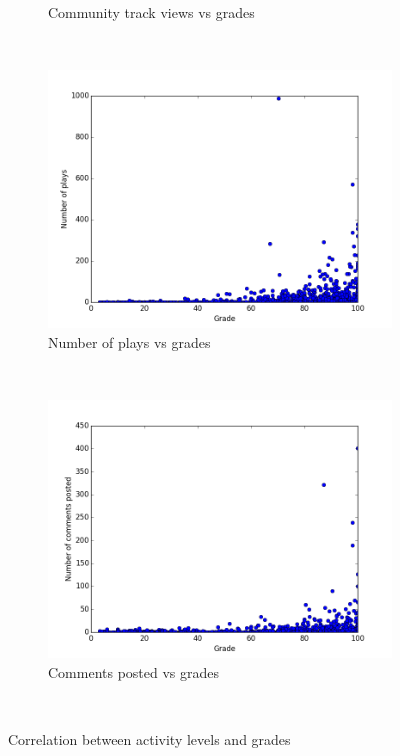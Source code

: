 \documentclass[11pt, oneside]{article}   	%
\begin{document}
\begin{figure}
\begin{subfigure}[b]{0.4\textwidth}
                 \caption{Community track views vs grades}
                 \label{communityTracks}
         \end{subfigure}
         ~ %
	\begin{subfigure}[b]{0.4\textwidth}
                 \includegraphics[width=\textwidth]{./pythonScripts/generalStatistics/plays.png}
                 \caption{Number of plays vs grades}
                 \label{plays}
         \end{subfigure}
         ~ %
        \begin{subfigure}[b]{0.4\textwidth}
                 \includegraphics[width=\textwidth]{./commentsPostedVsGrades.png}
                 \caption{Comments posted vs grades}
                 \label{commentsPosted}
         \end{subfigure}
         ~ %
        \caption{Correlation between activity levels and grades}
        \label{figure:activityCorrelationWithGrades}
\end{figure}
\newpage
\end{document}
